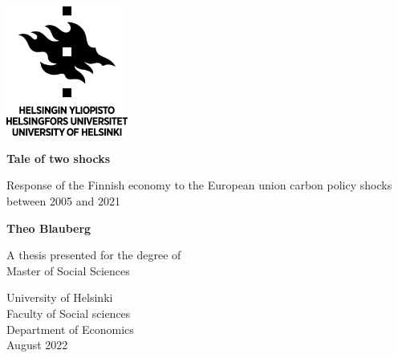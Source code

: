 \begin{titlepage}
    \begin{center}
        \vspace*{1cm}
        
        \includegraphics[width=0.3\textwidth]{latex/university.png}
        
        \vspace{1.5cm}
        
        \textbf{Tale of two shocks}
 
        \vspace{0.5cm}
         Response of the Finnish economy to the European union carbon policy shocks between 2005 and 2021 
             
        \vspace{0.5cm}
 
        \textbf{Theo Blauberg}
 
        \vfill
             
        A thesis presented for the degree of\\
        Master of Social Sciences
             
        \vspace{0.8cm}

    

    
        University of Helsinki\\
        Faculty of Social sciences\\
        Department of Economics\\
        August 2022

    \end{center}         
    
\end{titlepage}